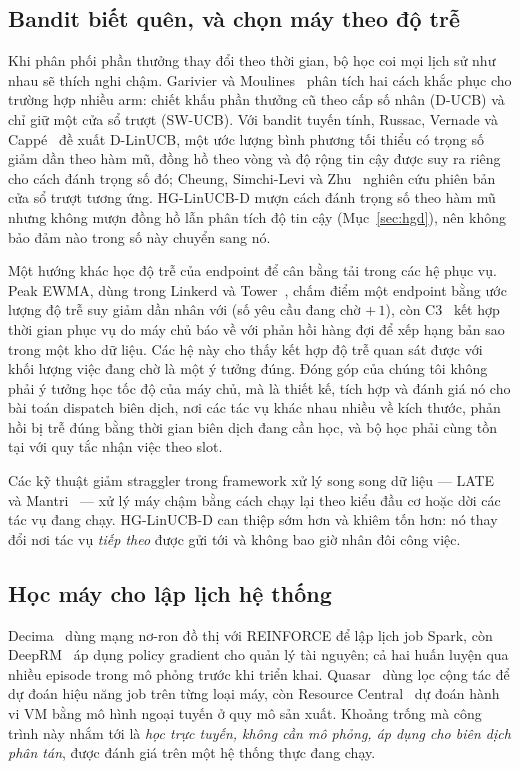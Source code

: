 \documentclass[final,5p,times,twocolumn]{elsarticle}
\begin{document}
\subsection{Bandit biết quên, và chọn máy theo độ trễ}

Khi phân phối phần thưởng thay đổi theo thời gian, bộ học coi mọi lịch sử như nhau sẽ thích nghi chậm. Garivier và Moulines~\cite{garivier2011} phân tích hai cách khắc phục cho trường hợp nhiều arm: chiết khấu phần thưởng cũ theo cấp số nhân (D-UCB) và chỉ giữ một cửa sổ trượt (SW-UCB). Với bandit tuyến tính, Russac, Vernade và Capp\'e~\cite{russac2019} đề xuất D-LinUCB, một ước lượng bình phương tối thiểu có trọng số giảm dần theo hàm mũ, đồng hồ theo vòng và độ rộng tin cậy được suy ra riêng cho cách đánh trọng số đó; Cheung, Simchi-Levi và Zhu~\cite{cheung2019} nghiên cứu phiên bản cửa sổ trượt tương ứng. HG-LinUCB-D mượn cách đánh trọng số theo hàm mũ nhưng không mượn đồng hồ lẫn phân tích độ tin cậy (Mục~\ref{sec:hgd}), nên không bảo đảm nào trong số này chuyển sang nó.

Một hướng khác học độ trễ của endpoint để cân bằng tải trong các hệ phục vụ. Peak EWMA, dùng trong Linkerd và Tower~\cite{linkerd2016,towerpeak}, chấm điểm một endpoint bằng ước lượng độ trễ suy giảm dần nhân với (số yêu cầu đang chờ $+\,1$), còn C3~\cite{c3} kết hợp thời gian phục vụ do máy chủ báo về với phản hồi hàng đợi để xếp hạng bản sao trong một kho dữ liệu. Các hệ này cho thấy kết hợp độ trễ quan sát được với khối lượng việc đang chờ là một ý tưởng đúng. Đóng góp của chúng tôi không phải ý tưởng học tốc độ của máy chủ, mà là thiết kế, tích hợp và đánh giá nó cho bài toán dispatch biên dịch, nơi các tác vụ khác nhau nhiều về kích thước, phản hồi bị trễ đúng bằng thời gian biên dịch đang cần học, và bộ học phải cùng tồn tại với quy tắc nhận việc theo slot.

Các kỹ thuật giảm straggler trong framework xử lý song song dữ liệu --- LATE~\cite{late} và Mantri~\cite{mantri} --- xử lý máy chậm bằng cách chạy lại theo kiểu đầu cơ hoặc dời các tác vụ đang chạy. HG-LinUCB-D can thiệp sớm hơn và khiêm tốn hơn: nó thay đổi nơi tác vụ \emph{tiếp theo} được gửi tới và không bao giờ nhân đôi công việc.

\subsection{Học máy cho lập lịch hệ thống}

Decima~\cite{decima} dùng mạng nơ-ron đồ thị với REINFORCE để lập lịch job Spark, còn DeepRM~\cite{deeprm} áp dụng policy gradient cho quản lý tài nguyên; cả hai huấn luyện qua nhiều episode trong mô phỏng trước khi triển khai. Quasar~\cite{quasar} dùng lọc cộng tác để dự đoán hiệu năng job trên từng loại máy, còn Resource Central~\cite{resourcecentral} dự đoán hành vi VM bằng mô hình ngoại tuyến ở quy mô sản xuất. Khoảng trống mà công trình này nhắm tới là \emph{học trực tuyến, không cần mô phỏng, áp dụng cho biên dịch phân tán}, được đánh giá trên một hệ thống thực đang chạy.
\end{document}

